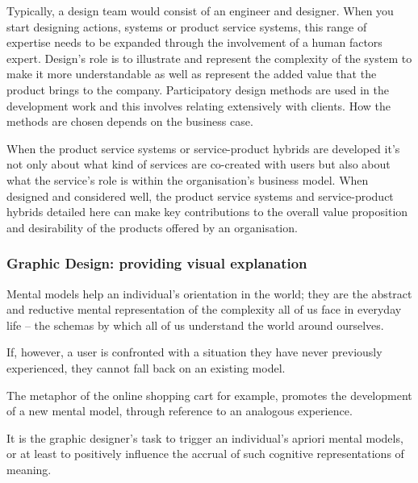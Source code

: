 Typically, a design team would consist of an engineer and designer. When you start designing actions, systems or product service systems, this range of expertise needs to be expanded through the involvement of a human factors expert. Design’s role is to illustrate and represent the complexity of the system to make it more understandable as well as represent the added value that the product brings to the company. Participatory design methods are used in the development work and this involves relating extensively with clients. How the methods are chosen depends on the business case.

When the product service systems or service-product hybrids are developed it’s not only about what kind of services are co-created with users but also about what the service’s role is within the organisation’s business model. When designed and considered well, the product service systems and service-product hybrids detailed here can make key contributions to the overall value proposition and desirability of the products offered by an organisation.

\subsubsection{Graphic Design: providing visual explanation}

Mental models help an individual’s orientation in the world; they are the abstract and reductive mental representation of the complexity all of us face in everyday life – the schemas by which all of us understand the world around ourselves.

If, however, a user is confronted with a situation they have never previously experienced, they cannot fall back on an existing model.

The metaphor of the online shopping cart for example, promotes the development of a new mental model, through reference to an analogous experience. %

It is the graphic designer’s task to trigger an individual’s apriori mental models, or at least to positively influence the accrual of such cognitive representations of meaning.


